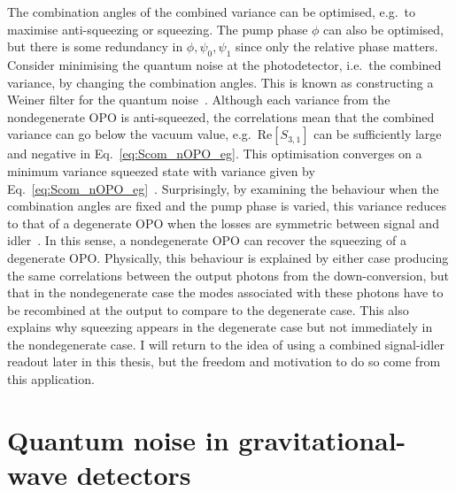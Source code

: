 The combination angles of the combined variance can be optimised, e.g.\ to maximise anti-squeezing or squeezing. The pump phase $\phi$ can also be optimised, but there is some redundancy in $\phi, \psi_0, \psi_1$ since only the relative phase matters. Consider minimising the quantum noise at the photodetector, i.e.\ the combined variance, by changing the combination angles. This is known as constructing a Weiner filter for the quantum noise~\cite{}. Although each variance from the nondegenerate OPO is anti-squeezed, the correlations mean that the combined variance can go below the vacuum value, e.g.\ $\text{Re}[S_{3,1}]$ can be sufficiently large and negative in Eq.~\ref{eq:Scom_nOPO_eg}. This optimisation  converges on a minimum variance squeezed state with variance given by Eq.~\ref{eq:Scom_nOPO_eg}~\cite{}. Surprisingly, by examining the behaviour when the combination angles are fixed and the pump phase is varied, this variance reduces to that of a degenerate OPO when the losses are symmetric between signal and idler~\cite{}. %
In this sense, a nondegenerate OPO can recover the squeezing of a degenerate OPO. Physically, this behaviour is explained by either case producing the same correlations between the output photons from the down-conversion, but that in the nondegenerate case the modes associated with these photons have to be recombined at the output to compare to the degenerate case. This also explains why squeezing appears in the degenerate case but not immediately in the nondegenerate case. %
I will return to the idea of using a combined signal-idler readout later in this thesis, but the freedom and motivation to do so come from this application. %



\section{Quantum noise in gravitational-wave detectors}
\label{sec:qnoise_GW_IFO}



